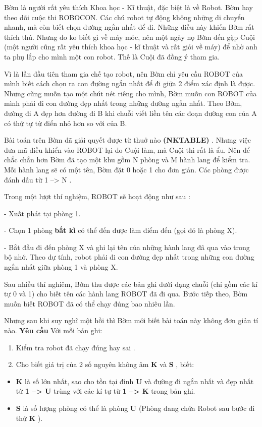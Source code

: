 Bờm là người rất yêu thích Khoa học - Kĩ thuật, đặc biệt là về Robot. Bờm hay theo dõi cuộc thi ROBOCON. Các chú robot tự động không những di chuyển nhanh, mà còn biết chọn đường ngắn nhất để đi. Những điều này khiến Bờm rất thích thú. Nhưng do ko biết gì về máy móc, nên một ngày nọ Bờm đến gặp Cuội (một người cũng rất yêu thích khoa học - kĩ thuật và rất giỏi về máy) để nhờ anh ta phụ lắp cho mình một con robot. Thế là Cuội đã đồng ý tham gia.

Vì là lần đầu tiên tham gia chế tạo robot, nên Bờm chỉ yêu cầu ROBOT của mình biết cách chọn ra con đường ngắn nhất để đi giữa 2 điểm xác định là được. Nhưng cũng muốn tạo một chút nét riêng cho mình, Bờm muốn con ROBOT của mình phải đi con đường đẹp nhất trong những đường ngắn nhất. Theo Bờm, đường đi A đẹp hơn đường đi B khi chuỗi viết liền tên các đoạn đường con của A có thứ tự từ điển nhỏ hơn so với của B.

Bài toán trên Bờm đã giải quyết được từ thuở nào \textbf{ (NKTABLE) } . Nhưng việc đưa mã điều khiển vào ROBOT lại do Cuội làm, mà Cuội thì rất là ẩu. Nên để chắc chắn hơn Bờm đã tạo một khu gồm N phòng và M hành lang để kiểm tra. Mỗi hành lang sẽ có một tên, Bờm đặt 0 hoặc 1 cho đơn giản. Các phòng được đánh dấu từ 1 --> N .

Trong một lượt thí nghiệm, ROBOT sẽ hoạt động như sau :

- Xuất phát tại phòng 1.

- Chọn 1 phòng \textbf{ bất kì }có thể đến được làm điểm đến (gọi đó là phòng X).

- Bắt đầu đi đến phòng X và ghi lại tên của những hành lang đã qua vào trong bộ nhớ. Theo dự tính, robot phải đi con đường đẹp nhất trong những con đường ngắn nhất giữa phòng 1 và phòng X.

Sau nhiều thí nghiêm, Bờm thu được các bản ghi dưới dạng chuỗi (chỉ gồm các kí tự 0 và 1) cho biết tên các hành lang ROBOT đã đi qua. Bước tiếp theo, Bờm muốn biết ROBOT đã có thể chạy đúng bao nhiêu lần.

Nhưng sau khi suy nghĩ một hồi thì Bờm mới biết bài toán này không đơn giản tí nào.
\textbf{Yêu cầu }
Với mỗi bản ghi:
\begin{enumerate}
	\item Kiểm tra robot đã chạy đúng hay sai .
	\item Cho biết giá trị của 2 số nguyên không âm \textbf{ K } và \textbf{ S } , biết:
\end{enumerate}
\begin{enumerate}
\end{enumerate}
\begin{itemize}
	\item \textbf{K } là số lớn nhất, sao cho tồn tại đỉnh \textbf{ U } và đường đi ngắn nhất và đẹp nhất từ \textbf{ 1 --> U } trùng với các kí tự từ \textbf{ 1 --> K } trong bản ghi.
	\item \textbf{S } là số lượng phòng có thể là phòng \textbf{ U } (Phòng đang chứa Robot sau bước đi thứ \textbf{ K } ).
\end{itemize}